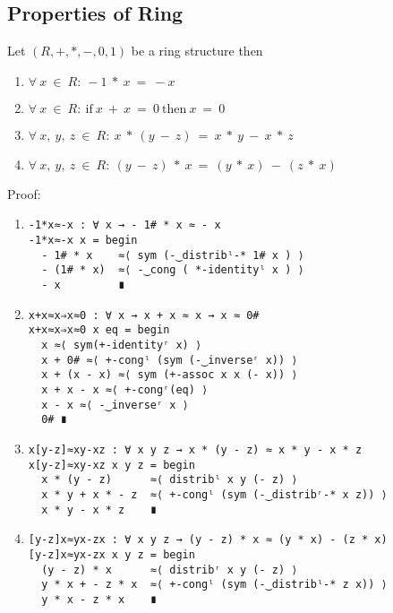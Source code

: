 \subsection{Properties of Ring}
Let $(R, +, *, -, 0, 1)$ be a ring structure then
\begin{enumerate}
\item \(\forall\ x\ \in\ R:\ - 1\ *\ x\ =\ -x\)
\item \(\forall\ x\ \in\ R:\ \text{if}\ x\ +\ x\ =\ 0\ \text{then}\ x\ =\ 0\)
\item \(\forall\ x,\ y,\ z\ \in\ R:\ x\ *\ (y\ -\ z)\ =\ x\ *\ y\ -\ x\ *\ z\)
\item \(\forall\ x,\ y,\ z\ \in\ R:\ (y\ -\ z)\ *\ x\ =\ (y\ *\ x)\ -\ (z\ *\ x)\)
\end{enumerate}
Proof:
\begin{enumerate}
\item
\begin{verbatim}
-1*x≈-x : ∀ x → - 1# * x ≈ - x
-1*x≈-x x = begin
  - 1# * x    ≈⟨ sym (-‿distribˡ-* 1# x ) ⟩
  - (1# * x)  ≈⟨ -‿cong ( *-identityˡ x ) ⟩
  - x         ∎
\end{verbatim}
\item
\begin{verbatim}
x+x≈x⇒x≈0 : ∀ x → x + x ≈ x → x ≈ 0#
x+x≈x⇒x≈0 x eq = begin
  x ≈⟨ sym(+-identityʳ x) ⟩
  x + 0# ≈⟨ +-congˡ (sym (-‿inverseʳ x)) ⟩
  x + (x - x) ≈⟨ sym (+-assoc x x (- x)) ⟩
  x + x - x ≈⟨ +-congʳ(eq) ⟩
  x - x ≈⟨ -‿inverseʳ x ⟩
  0# ∎
\end{verbatim}
\item
\begin{verbatim}
x[y-z]≈xy-xz : ∀ x y z → x * (y - z) ≈ x * y - x * z
x[y-z]≈xy-xz x y z = begin
  x * (y - z)      ≈⟨ distribˡ x y (- z) ⟩
  x * y + x * - z  ≈⟨ +-congˡ (sym (-‿distribʳ-* x z)) ⟩
  x * y - x * z    ∎
\end{verbatim}
\item
\begin{verbatim}
[y-z]x≈yx-zx : ∀ x y z → (y - z) * x ≈ (y * x) - (z * x)
[y-z]x≈yx-zx x y z = begin
  (y - z) * x      ≈⟨ distribʳ x y (- z) ⟩
  y * x + - z * x  ≈⟨ +-congˡ (sym (-‿distribˡ-* z x)) ⟩
  y * x - z * x    ∎
\end{verbatim}
\end{enumerate}